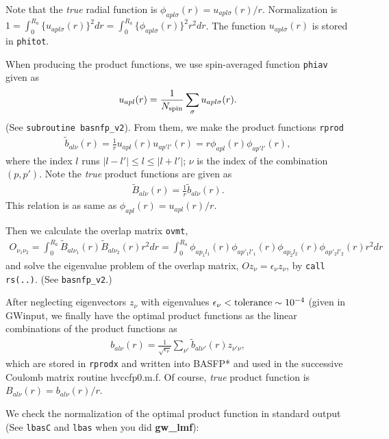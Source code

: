 \documentclass[a4paper,10pt,fleqn]{article}
\newcommand{\io}[1]{{\sf  #1}}
\begin{document}
Note that the \textit{true} radial function is
$\phi_{apl\sigma}(r) = u_{apl\sigma}(r)/r$.
Normalization is 
$1=\int_0^{R_a} \{ u_{apl\sigma}(r) \}^2 dr = 
   \int_0^{R_a} \{ \phi_{apl\sigma}(r) \}^2 r^2dr$.
The function $u_{apl\sigma}(r)$ is stored in \verb#phitot#.

When producing the product functions,
we use spin-averaged function \verb#phiav# given as
\begin{eqnarray}
   u_{apl}(r) = \frac{1}{N_{\rm spin}}\sum_{\sigma}
   u_{apl\sigma}(r).
\end{eqnarray}
(See \verb|subroutine basnfp_v2|).
From them, we make the product functions \verb#rprod#
\begin{eqnarray}
  \tilde{b}_{al\nu}(r) = \frac{1}{r}{u_{a p l }(r) u_{a p' l'}(r)}
  = r \phi_{a p l}(r) \phi_{a p' l'}(r),
\end{eqnarray}
where the index $l$ runs $|l-l'| \le l \le |l+l'|$;
$\nu$ is the index of the combination $(p,p')$.
Note the {\it true} product functions are given as
\begin{eqnarray}
  \tilde{B}_{al\nu}(r) = \frac{1}{r}\tilde{b}_{al\nu}(r).
\end{eqnarray}
This relation is as same as $\phi_{apl}(r)=u_{apl}(r)/r$.

Then we calculate the overlap matrix \verb#ovmt#,
\begin{eqnarray}
  O_{\nu_1\nu_2} = \int_0^{R_a} 
  \tilde{B}_{al\nu_1}(r) \tilde{B}_{al\nu_2}(r) r^2 dr
  = \int_0^{R_a}  \phi_{a p_1 l_1}(r) \phi_{a p'_1 l'_1}(r)
                  \phi_{a p_2 l_2}(r) \phi_{a p'_2 l'_2}(r) r^2 dr
\end{eqnarray}
and solve the eigenvalue problem of the overlap matrix,
$Oz_{\nu}=\epsilon_{\nu} z_{\nu}$, by \verb#call rs(..)#. 
(See \verb|basnfp_v2|.)

After neglecting eigenvectors
$z_{\nu}$ with eigenvalues $\epsilon_{\nu} < {\rm tolerance} \sim 10^{-4}$ (given in \io{GWinput}, 
we finally have the optimal product functions as the linear combinations 
of the product functions as
\begin{eqnarray}
   b_{al\nu}(r) = \frac{1}{\sqrt{\epsilon_{\nu}}}
   \sum_{\nu'}\tilde{b}_{al\nu'}(r)z_{\nu'\nu},
\end{eqnarray}
which are stored in \verb#rprodx# and written into {\sf BASFP*}
and used in the successive Coulomb matrix routine {\sf hvccfp0.m.f}.
Of course, \textit{true} product function is 
$B_{al\nu}(r) = b_{al\nu}(r)/r$.

We check the normalization of the optimal product function
in standard output 
(See \verb|lbasC| and \verb|lbas| when you did {\bf gw\_lmf}):
\end{document}

